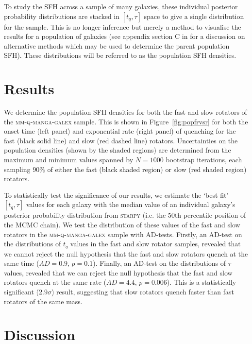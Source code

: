 \documentclass[useAMS,usenatbib]{mn2e}
\begin{document}
To study the SFH across a sample of many galaxies, these individual posterior probability distributions are stacked in $[t_q, \tau]$ space to give a single distribution for the sample. This is no longer inference but merely a method to visualise the results for a population of galaxies (see appendix section C in \citealt{smethurst16} for a discussion on alternative methods which may be used to determine the parent population SFH). These distributions will be referred to as the population SFH densities.

\section{Results}\label{sec:results}

We determine the population SFH densities for both the fast and slow rotators of the \textsc{mm-q-manga-galex} sample. This is shown in Figure~\ref{fig:popfrvsr} for both the onset time (left panel) and exponential rate (right panel) of quenching for the fast (black solid line) and slow (red dashed line) rotators. Uncertainties on the population densities (shown by the shaded regions) are determined from the maximum and minimum values spanned by $N = 1000$ bootstrap iterations, each sampling $90\%$ of either the fast (black shaded region) or slow (red shaded region) rotators. 

To statistically test the significance of our results, we estimate the `best fit' $[t_q, \tau]$ values for each galaxy with the median value of an individual galaxy's posterior probability distribution from \textsc{starpy} (i.e. the 50th percentile position of the MCMC chain). We test the distribution of these values of the fast and slow rotators in the \textsc{mm-q-manga-galex} sample with AD-tests. Firstly, an AD-test on the distributions of $t_q$ values in the fast and slow rotator samples, revealed that we cannot reject the null hypothesis that the fast and slow rotators quench at the same time ($AD= 0.9$, $p = 0.1$). Finally, an AD-test on the distributions of $\tau$ values, revealed that we can reject the null hypothesis that the fast and slow rotators quench at the same rate ($AD= 4.4$, $p = 0.006$). This is a statistically significant ($2.9\sigma$) result, suggesting that slow rotators quench faster than fast rotators of the same mass.


\section{Discussion}\label{sec:discussion}
\end{document}
